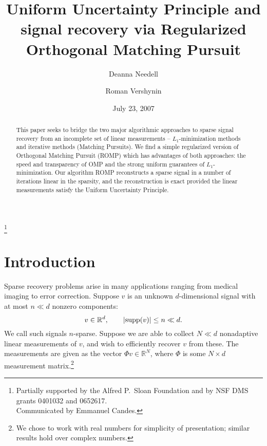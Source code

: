 \documentclass[12pt]{amsart}
\theoremstyle{plain}
\theoremstyle{definition}
\theoremstyle{remark}
\numberwithin{equation}{section}
\begin{document}
\title[]{Uniform Uncertainty Principle and signal recovery
  via Regularized Orthogonal Matching Pursuit}

\author{Deanna Needell
  \and Roman Vershynin}

\thanks{Partially supported by the Alfred P.~Sloan Foundation
  and by NSF DMS grants 0401032 and 0652617. \\Communicated by Emmanuel Candes.}
  
\date{July 23, 2007}

\address{Department of Mathematics,
   University of California,
   Davis, CA 95616, USA}

\begin{abstract}
  This paper seeks to bridge the two major algorithmic approaches
  to sparse signal recovery from an incomplete set of linear measurements --
  $L_1$-mini\-mization methods and iterative methods (Matching Pursuits).
  We find a simple regularized version of Orthogonal Matching Pursuit (ROMP) 
  which has advantages of both approaches: the speed and transparency of OMP
  and the strong uniform guarantees of $L_1$-minimization.
  Our algorithm ROMP reconstructs a sparse signal in a number of iterations
  linear in the sparsity, 
  and the reconstruction is exact provided the linear measurements 
  satisfy the Uniform Uncertainty Principle.
\end{abstract}
\maketitle

\section{Introduction}

Sparse recovery problems arise in many applications ranging from medical imaging 
to error correction.
Suppose $v$ is an unknown $d$-dimensional signal with at most $n \ll d$ 
nonzero components:
$$
v \in {\mathbb{R}}^d, \qquad |{{\rm supp}}(v)| \le n \ll d.
$$
We call such signals $n$-sparse.
Suppose we are able to collect $N \ll d$ nonadaptive linear measurements of $v$, 
and wish to efficiently recover $v$ from these.
The measurements are given as the vector $\Phi v \in {\mathbb{R}}^N$, 
where $\Phi$ is some $N \times d$ measurement matrix.\footnote{We chose to
work with real numbers for simplicity of presentation; similar results
hold over complex numbers.}
\end{document}
